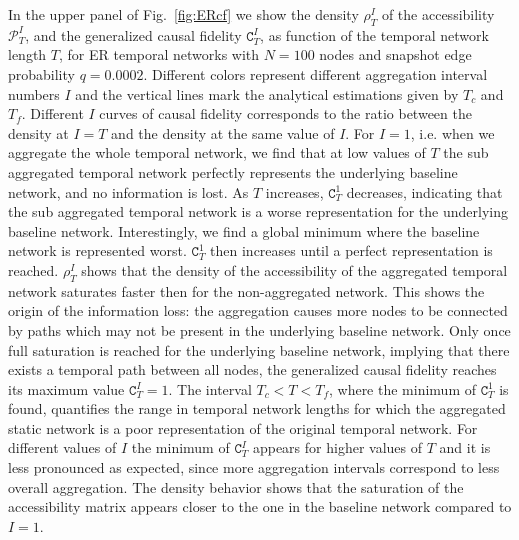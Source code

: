 \documentclass[%
 reprint,
 amsmath,amssymb,
 aps,
]{revtex4-2}
\begin{document}
In the upper panel of Fig.~\ref{fig:ERcf} we show the density $\rho_T^I$ of the accessibility $\mathcal{P}^I_T$, and the generalized causal fidelity $\mathtt{C}^I_T$, as function of the temporal network length $T$, for ER temporal networks with $N=100$ nodes and snapshot edge probability $q=0.0002$.
Different colors represent different aggregation interval numbers  $I$ and the vertical lines mark the analytical estimations given by $T_c$ and $T_f$. 
Different $I$ curves of causal fidelity corresponds to the ratio between the density at $I=T$ and the density at the same value of $I$. 
For $I=1$, i.e. when we aggregate the whole temporal network, we find that at low values of $T$ the sub aggregated temporal network perfectly represents the underlying baseline network, and no information is lost.  As $T$ increases, $\mathtt{C}^1_T$ decreases, indicating that the sub aggregated temporal network is a worse representation for the underlying baseline network.
Interestingly, we find a global minimum where the baseline network is represented worst. $\mathtt{C}^1_T$ then increases until a perfect representation is reached. $\rho_T^I$ shows that the density of the accessibility of the aggregated temporal network saturates faster then for the non-aggregated network. This shows the origin of the information loss: the aggregation causes more nodes to be connected by paths which may not be present in the underlying baseline network. Only once full saturation is reached for the underlying baseline network, implying that there exists a temporal path between all nodes, the generalized causal fidelity reaches its maximum value $\mathtt{C}^I_T=1$. The interval $T_c<T<T_f$, where the minimum of $\mathtt{C}^1_T$ is found, quantifies the range in temporal network lengths for which the aggregated static network is a poor representation of the original temporal network. 
For different values of $I$ the minimum of $\mathtt{C}^I_T$ appears for higher values of $T$ and it is less pronounced as expected, since more aggregation intervals correspond to less overall aggregation. The density behavior shows that the saturation of the accessibility matrix appears closer to the one in the baseline network compared to $I=1$.  
\end{document}
